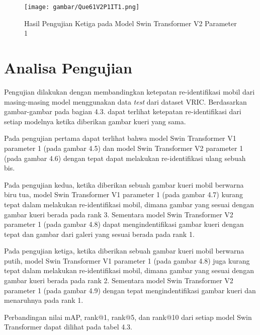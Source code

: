 \begin{figure}[ht]
  \centering
  \texttt{[image: gambar/Que61V2P1IT1.png]}
  \caption{Hasil Pengujian Ketiga pada Model Swin Transformer V2 Parameter 1}
  \label{fig:hasilpengujianketigapadamodelswintransformerv2param1}
\end{figure}

\section{Analisa Pengujian}
\label{sec:analisapengujian}

Pengujian dilakukan dengan membandingkan ketepatan re-identifikasi mobil dari masing-masing model menggunakan 
data \emph{test} dari dataset VRIC. Berdasarkan gambar-gambar pada bagian 4.3. dapat terlihat ketepatan 
re-identifikasi dari setiap modelnya ketika diberikan gambar kueri yang sama. 

Pada pengujian pertama dapat terlihat bahwa model Swin Transformer V1 parameter 1 (pada gambar 4.5) 
dan model Swin Transformer V2 parameter 1 (pada gambar 4.6) dengan tepat dapat melakukan re-identifikasi 
ulang sebuah bis.

Pada pengujian kedua, ketika diberikan sebuah gambar kueri mobil berwarna biru tua, model Swin Transformer V1 
parameter 1 (pada gambar 4.7) kurang tepat dalam melakukan re-identifikasi mobil, dimana gambar yang sesuai 
dengan gambar kueri berada pada rank 3. Sementara model Swin Transformer V2 parameter 1 (pada gambar 4.8) dapat 
mengindentifikasi gambar kueri dengan tepat dan gambar dari galeri yang sesuai berada pada rank 1.

Pada pengujian ketiga, ketika diberikan sebuah gambar kueri mobil berwarna putih, model Swin Transformer V1 
parameter 1 (pada gambar 4.8) juga kurang tepat dalam melakukan re-identifikasi mobil, dimana gambar yang sesuai 
dengan gambar kueri berada pada rank 2. Sementara model Swin Transformer V2 parameter 1 (pada gambar 4.9) dengan 
tepat mengindentifikasi gambar kueri dan menaruhnya pada rank 1.

Perbandingan nilai mAP, rank@1, rank@5, dan rank@10 dari setiap model Swin Transformer dapat dilihat pada tabel 
4.3.

